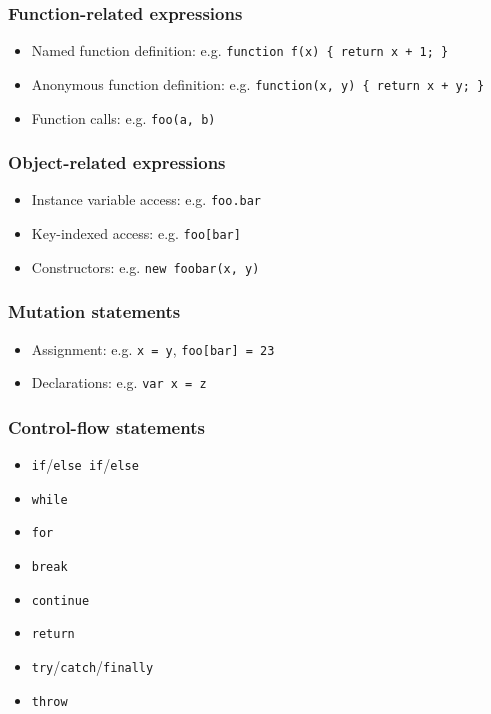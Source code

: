 \documentclass{article}
\begin{document}
\subsubsection*{Function-related expressions}

\begin{itemize}
  \item Named function definition: e.g. \texttt{function f(x) \{ return x + 1; \} }
  \item Anonymous function definition: e.g. \texttt{function(x, y) \{ return x + y; \} }
  \item Function calls: e.g. \texttt{foo(a, b)}
\end{itemize}

\subsubsection*{Object-related expressions}

\begin{itemize}
  \item Instance variable access: e.g. \texttt{foo.bar}
  \item Key-indexed access: e.g. \texttt{foo[bar]}
  \item Constructors: e.g. \texttt{new foobar(x, y)}
\end{itemize}

\subsubsection*{Mutation statements}

\begin{itemize}
  \item Assignment: e.g. \texttt{x = y}, \texttt{foo[bar] = 23}
  \item Declarations: e.g. \texttt{var x = z}
\end{itemize}

\subsubsection*{Control-flow statements}

\begin{itemize}
  \item \texttt{if}/\texttt{else if}/\texttt{else}
  \item \texttt{while}
  \item \texttt{for}
  \item \texttt{break}
  \item \texttt{continue}
  \item \texttt{return}
  \item \texttt{try}/\texttt{catch}/\texttt{finally}
  \item \texttt{throw}
\end{itemize}
\end{document}
